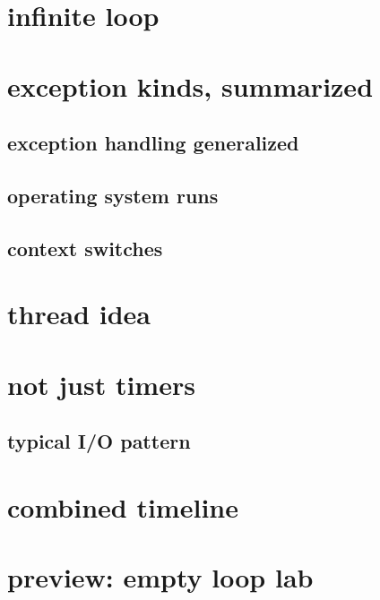 \section{infinite loop}


\section{exception kinds, summarized}


\subsection{exception handling generalized}


\subsection{operating system runs}


\subsection{context switches} 


\section{thread idea}


\section{not just timers}

\subsection{typical I/O pattern}




\section{combined timeline}


\section{preview: empty loop lab}


